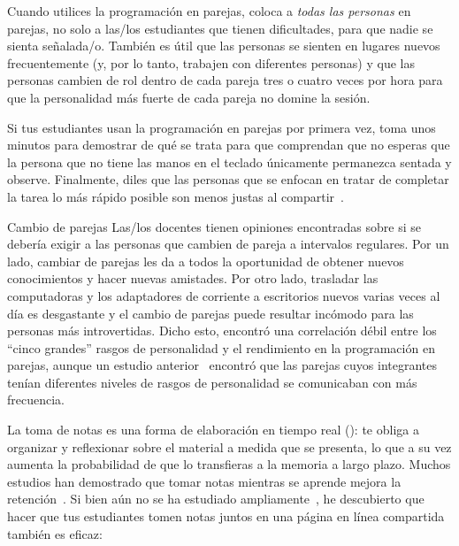 Cuando utilices la programación en parejas,
coloca a \emph{todas las personas} en parejas,
no solo a las/los estudiantes que tienen dificultades,
para que nadie se sienta señalada/o.
También es útil que las personas se sienten en lugares nuevos frecuentemente
(y, por lo tanto, trabajen con diferentes personas)
y que las personas cambien de rol dentro de cada pareja tres o cuatro veces por hora
para que la personalidad más fuerte de cada pareja no domine la sesión.

Si tus estudiantes usan la programación en parejas por primera vez,
toma unos minutos para demostrar de qué se trata
para que comprendan que
no esperas que la persona que no tiene las manos en el teclado
únicamente permanezca sentada y observe.
Finalmente,
diles que las personas que se enfocan en tratar de completar la tarea lo más rápido posible
son menos justas al compartir~\cite{Lewi2015}.

\begin{aside}{Cambio de parejas}
  Las/los docentes tienen opiniones encontradas sobre si se debería exigir a las personas que cambien de pareja a intervalos regulares.
  Por un lado, cambiar de parejas les da a todos la oportunidad de obtener nuevos conocimientos y hacer nuevas amistades.
  Por otro lado,
  trasladar las computadoras y los adaptadores de corriente a escritorios nuevos varias veces al día es desgastante
  y el cambio de parejas puede resultar incómodo para las personas más introvertidas.
  Dicho esto,
  \cite{Hann2010} encontró una correlación débil entre los ``cinco grandes'' rasgos de personalidad 
  y el rendimiento en la programación en parejas,
  aunque un estudio anterior~\cite{Wall2009} encontró que
  las parejas cuyos integrantes tenían diferentes niveles de rasgos de personalidad se comunicaban con más frecuencia.
\end{aside}


La toma de notas es una forma de elaboración en tiempo real ():
te obliga a organizar y reflexionar sobre el material a medida que se presenta,
lo que a su vez aumenta la probabilidad de que lo transfieras a la memoria a largo plazo.
Muchos estudios han demostrado que
tomar notas mientras se aprende mejora la retención~\cite{Aike1975,Boha2011}.
Si bien aún no se ha estudiado ampliamente~\cite{Ornd2015,Yang2015},
he descubierto que hacer que tus estudiantes tomen notas juntos en una página en línea compartida también es eficaz:

